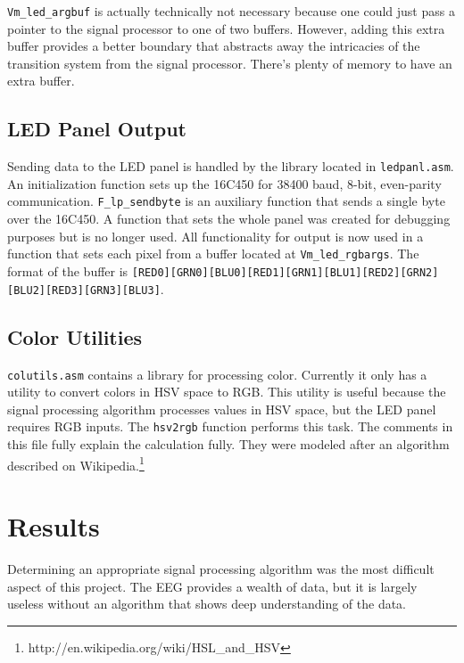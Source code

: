 \documentclass[letterpaper,10pt,notitlepage]{report}
\newcommand{\dat}[1]{\texttt{#1}}
\begin{document}
        \dat{Vm\_led\_argbuf} is actually technically not necessary because
        one could just pass a pointer to the signal processor to one of two
        buffers.  However, adding this extra buffer provides a better boundary
        that abstracts away the intricacies of the transition system from the
        signal processor.  There's plenty of memory to have an extra buffer.

    \subsection{LED Panel Output}

        Sending data to the LED panel is handled by the library located in
        \dat{ledpanl.asm}.  An initialization function sets up the 16C450 for
        38400 baud, 8-bit, even-parity communication.  \dat{F\_lp\_sendbyte} is
        an auxiliary function that sends a single byte over the 16C450.  A
        function that sets the whole panel was created for debugging purposes
        but is no longer used.  All functionality for output is now used in a
        function that sets each pixel from a buffer located at
        \dat{Vm\_led\_rgbargs}.  The format of the buffer is
        \dat{[RED0][GRN0][BLU0][RED1][GRN1][BLU1][RED2][GRN2][BLU2][RED3][GRN3][BLU3]}.

    \subsection{Color Utilities}

        \dat{colutils.asm} contains a library for processing color.  Currently
        it only has a utility to convert colors in HSV space to RGB.  This
        utility is useful because the signal processing algorithm processes
        values in HSV space, but the LED panel requires RGB inputs.  The
        \dat{hsv2rgb} function performs this task.  The comments in this file
        fully explain the calculation fully.  They were modeled after an
        algorithm described on
        Wikipedia.\footnote{http://en.wikipedia.org/wiki/HSL\_and\_HSV}

\section{Results}

    Determining an appropriate signal processing algorithm was the most
    difficult aspect of this project.  The EEG provides a wealth of data, but
    it is largely useless without an algorithm that shows deep understanding of
    the data.
\end{document}

